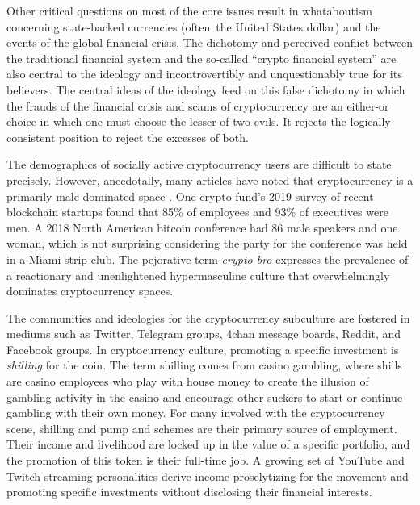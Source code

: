 
Other critical questions on most of the core issues result in whataboutism
concerning state-backed currencies (often the United States dollar) and the
events of the global financial crisis. The dichotomy and perceived conflict
between the traditional financial system and the so-called ``crypto financial
system'' are also central to the ideology and incontrovertibly and
unquestionably true for its believers. The central ideas of the ideology feed on
this false dichotomy in which the frauds of the financial crisis and scams of
cryptocurrency are an either-or choice in which one must choose the lesser of
two evils. It rejects the logically consistent position to reject the excesses
of both. \cite{golumbia_zealots_2018, wolf_libertarian_2019,
golumbia_cyberlibertarians_2013}


The demographics of socially active cryptocurrency users are difficult to state
precisely. However, anecdotally, many articles have noted that cryptocurrency is
a primarily male-dominated space \cite{penny_four_2018}. One crypto fund's 2019 survey
of recent blockchain startups found that 85\% of employees and 93\% of
executives were men. A 2018 North American bitcoin conference had 86 male
speakers and one woman, which is not surprising considering the party for the
conference was held in a Miami strip club. The pejorative term \textit{crypto
bro} expresses the prevalence of a reactionary and unenlightened hypermasculine
culture that overwhelmingly dominates cryptocurrency spaces.


The communities and ideologies for the cryptocurrency subculture are fostered in
mediums such as Twitter, Telegram groups, 4chan message boards, Reddit, and
Facebook groups. In cryptocurrency culture, promoting a specific investment is
\textit{shilling} for the coin. The term shilling comes from casino gambling,
where shills are casino employees who play with house money to create the
illusion of gambling activity in the casino and encourage other suckers to start
or continue gambling with their own money. For many involved with the
cryptocurrency scene, shilling and pump and schemes are their primary source of
employment. Their income and livelihood are locked up in the value of a specific
portfolio, and the promotion of this token is their full-time job. A growing set
of YouTube and Twitch streaming personalities derive income proselytizing for
the movement and promoting specific investments without disclosing their
financial interests. \cite{powell_crypto-shills_2019}

